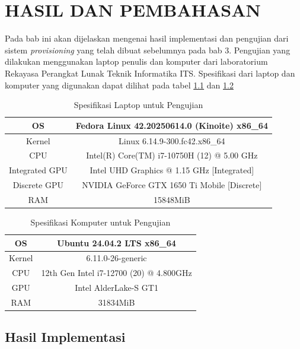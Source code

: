 \chapter{HASIL DAN PEMBAHASAN}
\label{chap:hasil-pembahasan}

Pada bab ini akan dijelaskan mengenai hasil implementasi
dan pengujian dari sistem \emph{provisioning} yang telah
dibuat sebelumnya pada bab 3. Pengujian yang dilakukan
menggunakan laptop penulis dan komputer dari laboratorium Rekayasa Perangkat
Lunak Teknik Informatika ITS. Spesifikasi dari laptop dan komputer
yang digunakan dapat dilihat pada tabel \ref{tb:spesifikasi-laptop-pengujian} dan
\ref{tb:spesifikasi-komputer-pengujian}

\begin{longtable}{|c|c|}
  \caption{Spesifikasi Laptop untuk Pengujian}
  \label{tb:spesifikasi-laptop-pengujian} \\
  \hline
  OS     & Fedora Linux 42.20250614.0 (Kinoite) x86\_64 \\
  \hline
  Kernel & Linux 6.14.9-300.fc42.x86\_64                \\
  \hline
  CPU    & Intel(R) Core(TM) i7-10750H (12) @ 5.00 GHz       \\
  \hline
  Integrated GPU   & Intel UHD Graphics @ 1.15 GHz [Integrated]       \\
  \hline
  Discrete GPU    & NVIDIA GeForce GTX 1650 Ti Mobile [Discrete]       \\
  \hline
  RAM    & 15848MiB       \\
  \hline
\end{longtable}

\begin{longtable}{|c|c|}
  \caption{Spesifikasi Komputer untuk Pengujian}
  \label{tb:spesifikasi-komputer-pengujian} \\
  \hline
  OS     & Ubuntu 24.04.2 LTS x86\_64 \\
  \hline
  Kernel & 6.11.0-26-generic          \\
  \hline
  CPU    & 12th Gen Intel i7-12700 (20) @ 4.800GHz       \\
  \hline
  GPU    & Intel AlderLake-S GT1       \\
  \hline
  RAM    & 31834MiB       \\
  \hline
\end{longtable}

\section{Hasil Implementasi}
\label{sec:hasil-implementasi}

